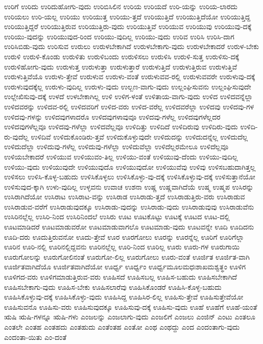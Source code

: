 {ಉರಿಗೆ
ಉರಿದು
ಉರಿದುಹೋಗು-ವುದು
ಉರಿಬಿಸಿಲಿನ
ಉರಿಯ
ಉರಿಯದೆ
ಉರಿ-ಯನ್ನು
ಉರಿಯ-ಲಾರದು
ಉರಿಯಲು
ಉರಿ-ಯಲ್ಲ
ಉರಿಯು
ಉರಿಯುತ್ತ
ಉರಿಯು-ತ್ತದೆ
ಉರಿಯುತ್ತಿದೆ
ಉರಿಯುತ್ತಿದೆಯೋ
ಉರಿಯುತ್ತಿದ್ದ
ಉರಿಯುತ್ತಿದ್ದರೆ
ಉರಿಯುತ್ತಿರುವ
ಉರಿಯುತ್ತಿರು-ವುದು
ಉರಿಯುತ್ತಿವೆ
ಉರಿಯುವ
ಉರಿಯುವು
ಉರಿಯುವು-ದಕ್ಕೆ
ಉರಿಯು-ವುದನ್ನು
ಉರಿಯುವುದ-ರಿಂದ
ಉರಿಯು-ವುದಿಲ್ಲ
ಉರಿಯು-ವುದು
ಉರಿವ
ಉರಿಸಿ
ಉರಿಸಿ-ದಾಗ
ಉರಿಸಿಬಿಡು-ವುದು
ಉರಿಸುವ
ಉರುಲು
ಉರುಳಬೇಕಾಗಿದೆ
ಉರುಳಬೇಕಾಗು-ವುದು
ಉರುಳಬೇಕಾದರೆ
ಉರುಳ-ಬೇಕು
ಉರುಳಿ
ಉರುಳಿ-ಕೊಂಡು
ಉರುಳಿತು
ಉರುಳಿಬಂದು
ಉರುಳಿಸಲು
ಉರುಳಿಸಿ
ಉರುಳಿ-ಸುತ್ತ
ಉರುಳಿಸು-ದಕ್ಕೆ
ಉರುಳಿಹೋಗು-ವುದು
ಉರುಳುತ್ತ
ಉರುಳುತ್ತಾ
ಉರುಳುತ್ತಾರೆ
ಉರುಳುತ್ತಿದೆ
ಉರುಳುತ್ತಿರುವ
ಉರುಳುತ್ತಿವೆ
ಉರುಳುತ್ತಿವೆಯೊ
ಉರುಳು-ತ್ತೇವೆ
ಉರುಳುವ
ಉರುಳು-ವಂತೆ
ಉರುಳುವವ-ರಲ್ಲಿ
ಉರುಳುವವರೇ
ಉರುಳುವು-ದಕ್ಕೆ
ಉರುಳುವುದಕ್ಕೆಲ್ಲ
ಉರುಳು-ವುದಿಲ್ಲ
ಉರುಳು-ವುದು
ಉಲ್ಬಣ-ವಾಗು-ವುದು
ಉಲ್ಲಂಘಿಸುವನು
ಉಲ್ಲಂಘಿಸುವುದೇ
ಉಲ್ಲೇಖಿಸುವು-ದಕ್ಕೆ
ಉಳದೆ
ಉಳಬೇಕಾಗಿಲ್ಲ
ಉಳಿ
ಉಳಿಗ-ಳಂತೆ
ಉಳಿತಾಯ-ವಾಗು-ವುದು
ಉಳಿದ
ಉಳಿದವನ್ನೆಲ್ಲಾ
ಉಳಿದವರನ್ನು
ಉಳಿದವ-ರಲ್ಲಿ
ಉಳಿದವರಿಗೆ
ಉಳಿದ-ವರು
ಉಳಿದ-ವರೆಲ್ಲ
ಉಳಿದವರೆಲ್ಲಾ
ಉಳಿದವು
ಉಳಿದವು-ಗಳ
ಉಳಿದವು-ಗಳನ್ನು
ಉಳಿದವುಗಳಾದರೊ
ಉಳಿದವುಗಳಾವುವೂ
ಉಳಿದವು-ಗಳೆಲ್ಲ
ಉಳಿದವುಗಳೆಲ್ಲದರ
ಉಳಿದವುಗಳೆಲ್ಲವೂ
ಉಳಿದವು-ಗಳೆಲ್ಲಾ
ಉಳಿದವೆಲ್ಲವೂ
ಉಳಿದಿತ್ತು
ಉಳಿದಿದೆ
ಉಳಿದಿರುವು
ಉಳಿದಿರು-ವುದು
ಉಳಿದಿ-ರು-ವುದೆಲ್ಲ
ಉಳಿದಿವೆ
ಉಳಿದುಕೊಂಡಿರು-ತ್ತವೆ
ಉಳಿದುಕೊಳ್ಳುವುದೇ
ಉಳಿದುದನ್ನು
ಉಳಿದುದನ್ನೆಲ್ಲ
ಉಳಿದುದೆಲ್ಲ
ಉಳಿದುದೆಲ್ಲಾ
ಉಳಿದುವು-ಗಳೆಲ್ಲ
ಉಳಿದುವು-ಗಳೆಲ್ಲಾ
ಉಳಿದುವೆಲ್ಲಾ
ಉಳಿದೆಲ್ಲರಮೇಲೂ
ಉಳಿದೆಲ್ಲವೂ
ಉಳಿಯಬೇಕಾದರೆ
ಉಳಿಯುವ
ಉಳಿಯುವಂ-ತಿಲ್ಲ
ಉಳಿಯು-ವಂತೆ
ಉಳಿಯುವು-ದೆಂದು
ಉಳಿಯು-ವುದಿಲ್ಲ
ಉಳಿಯು-ವುದು
ಉಳಿಯುವುದೇ
ಉಳಿಯುವುದೊ
ಉಳಿಯುವುದೋ
ಉಳಿಯುವೆವು
ಉಳಿವು
ಉಳಿಸಬಹುದಾಗಿತ್ತಲ್ಲ
ಉಳಿಸಲು
ಉಳಿಸಿ-ಕೊಳ್ಳ-ಬಹುದು
ಉಳಿಸಿಕೊಳ್ಳಲು
ಉಳಿಸಿಕೊಳ್ಳು-ವು-ದಕ್ಕೆ
ಉಳಿಸಿಕೊಳ್ಳುವು-ದಕ್ಕೆ
ಉಳಿಸುತ್ತಾನೆಯೋ
ಉಳಿಸುವುದ-ಕ್ಕಾಗಿ
ಉಳು-ವುದಿಲ್ಲ
ಉಳ್ಳವನು
ಉವಾಚ
ಉಶನಾ
ಉಷ್ಣ
ಉಷ್ಣವಾಗಿದೆಯೆ
ಉಷ್ಮ
ಉಷ್ಮಪ
ಉಸಿರನ್ನು
ಉಸಿರಾಗಿದೆಯೋ
ಉಸಿರಾಟ
ಉಸಿರಾಟ-ವನ್ನು
ಉಸಿರಾಡ
ಉಸಿರಾಡು-ತ್ತದೆ
ಉಸಿರಾಡುತ್ತಿರು-ವರು
ಉಸಿರಾಡುವ
ಉಸಿರಾಡುವ-ವರೆಗೆ
ಉಸಿರಾಡುವುದಕ್ಕೂ
ಉಸಿರಾಡು-ವುದನ್ನು
ಉಸಿರಾಡು-ವುದು
ಉಸಿರಾಡುವುವು
ಉಸಿರಾಡುವೆನು
ಉಸಿರಿನಲ್ಲೆಲ್ಲ
ಉಸಿರಿ-ನಿಂದ
ಉಸಿರಿನಿಂದಲೆ
ಉಸಿರು
ಊಟ
ಊಟಕೊಟ್ಟು
ಊಟಕ್ಕೆ
ಊಟದ
ಊಟ-ದಲ್ಲಿ
ಊಟಮಾಡಿದರೆ
ಊಟಮಾಡುವರೋ
ಊಟಮಾಡುವಾಗಲೊ
ಊಟಮಾಡು-ವುದು
ಊಟವನ್ನೇ
ಊದಿ
ಊದಿದನು
ಊದಿ-ದರು
ಊದುತ್ತಿರುವನೋ
ಊದು-ತ್ತೇವೆ
ಊರ
ಊರಗೋಲು
ಊರನ್ನು
ಊರನ್ನೆಲ್ಲ
ಊರಿಗೆ
ಊರಿಗೆಲ್ಲಾ
ಊರಿನ
ಊರಿ-ನಲ್ಲಿ
ಊರಿನಲ್ಲಿದ್ದವನು
ಊರಿನಲ್ಲೆಲ್ಲ
ಊರಿ-ನಿಂದ
ಊರಿಲ್ಲ
ಊರು
ಊರು-ಗಳ
ಊರುಗಾಯಿ
ಊರುಗೋಲನ್ನು
ಊರುಗೋಲಿನಂತೆ
ಊರುಗೋ-ಲಿಲ್ಲ
ಊರುಗೋಲು
ಊರು-ವಂತೆ
ಊರ್ಜಿತ
ಊರ್ಜಿತ-ವಾಗಿ
ಊರ್ಜಿತವಾಗಿದೆಯೊ
ಊರ್ಜಿತವಾಗಿದೆಯೋ
ಊರ್ಧ್ವ
ಊರ್ಧ್ವಂ
ಊರ್ಧ್ವಮೂಲಮಧಃಶಾಖಮಶ್ವತ್ಥಂ
ಊಳಿಗ
ಊಳಿಗದ-ವರು
ಊಳಿಗಮಾಡುತ್ತಿರುವ-ವರು
ಊಹಿಸದೆ
ಊಹಿಸಬಲ್ಲ
ಊಹಿಸ-ಬಹುದು
ಊಹಿಸಬೇಕಾಗಿದೆ
ಊಹಿಸಬೇಕಾಗು-ವುದು
ಊಹಿಸ-ಬೇಕು
ಊಹಿಸಲಾರೆವು
ಊಹಿಸಿಕೊಂಡರೆ
ಊಹಿಸಿ-ಕೊಳ್ಳ-ಬಹುದು
ಊಹಿಸಿಕೊಳ್ಳುವು-ದಕ್ಕೆ
ಊಹಿಸಿಕೊಳ್ಳು-ವುದು
ಊಹಿಸಿದ್ದ
ಊಹಿಸಿರ-ಲಿಲ್ಲ
ಊಹಿಸು-ತ್ತೇವೆ
ಊಹಿಸುತ್ತೇವೆಯೋ
ಊಹಿಸುವನೊ
ಊಹಿಸು-ವರು
ಊಹಿಸುವುದಕ್ಕೂ
ಊಹಿಸುವು-ದಕ್ಕೆ
ಊಹಿಸು-ವುದು
ಊಹೆ
ಊಹೆಗೆ
ಊಹೆ-ಯಂತೆ
ಋಷಿ
ಋಷಿ-ಗಳನ್ನೂ
ಋಷಿ-ಗಳು
ಎಂಜಲನ್ನು
ಎಂಜಲಾಗು-ವುದು
ಎಂಜಲಿಗೆ
ಎಂಜಲು
ಎಂಜಿನ್
ಎಂಟು
ಎಂತಲೂ
ಎಂತಲೇ
ಎಂತಹ
ಎಂತಹದು
ಎಂತಹುದು
ಎಂತೆಂತಹ
ಎಂತೋ
ಎಂಥ
ಎಂಥದ್ದು
ಎಂದ
ಎಂದಂತಾಗು-ವುದು
ಎಂದಂತಾ-ಯಿತು
ಎಂ-ದಂತೆ
}
